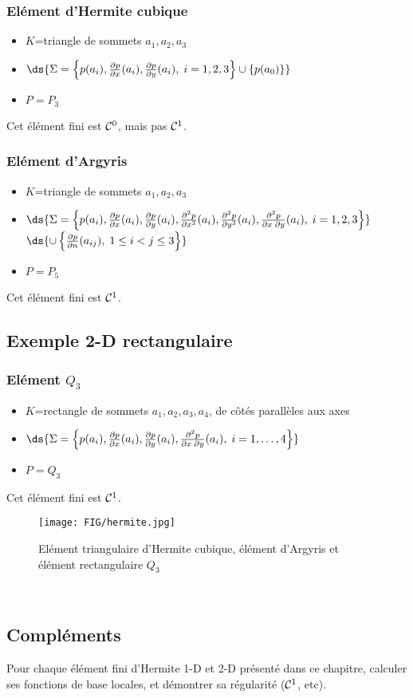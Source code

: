 \subsubsection{El\'ement d'Hermite cubique}
\begin{itemize}
\item $K$=triangle de sommets $a_1, a_2, a_3$
\item $\ds{ \Sigma=\left\{p(a_i),\frac{\partial p}{\partial x}(a_i), \frac{\partial p}{\partial y}(a_i), \; i=1,2,3\right\} \cup \left\{p(a_0)\right\} }$
\item $P=P_3$
\end{itemize}
%
Cet \'el\'ement fini est ${\cal C}^0$, mais pas ${\cal C}^1$.
%
\subsubsection{El\'ement d'Argyris}
\begin{itemize}
\item $K$=triangle de sommets $a_1, a_2, a_3$
\item $\ds{ \Sigma=\left\{p(a_i),\frac{\partial p}{\partial x}(a_i), \frac{\partial p}{\partial y}(a_i),\frac{\partial^2 p}{\partial x^2}(a_i), \frac{\partial^2 p}{\partial y^2}(a_i), \frac{\partial^2 p}{\partial x\; \partial y}(a_i),\; i=1,2,3\right\} }$\\
\hspace*{5 cm}$\ds{\cup \left\{\frac{\partial p}{\partial n}(a_{ij}), \; 1\le i < j \le 3\right\} }$
\item $P=P_5$
\end{itemize}
%
Cet \'el\'ement fini est ${\cal C}^1$.
%
%
\subsection{Exemple 2-D rectangulaire}
%
\subsubsection{El\'ement $Q_3$}
\begin{itemize}
\item $K$=rectangle de sommets $a_1, a_2, a_3, a_4$, de c\^ot\'es parall\`eles aux axes
\item $\ds{ \Sigma=\left\{p(a_i),\frac{\partial p}{\partial x}(a_i), \frac{\partial p}{\partial y}(a_i), \frac{\partial^2 p}{\partial x\; \partial y}(a_i),\; i=1,\ldots,4\right\} }$
\item $P=Q_3$ 
\end{itemize}
%
Cet \'el\'ement fini est ${\cal C}^1$.
%
%
%
%
\begin{figure}[h]
\begin{center}
\texttt{[image: FIG/hermite.jpg]}
\caption{El\'ement triangulaire d'Hermite cubique, \'el\'ement d'Argyris et \'el\'ement rectangulaire $Q_3$}
\end{center}
\end{figure}
%
%
%
\small
~\vspace*{3cm}\\
\subsection*{Compl\'ements}
\noindent
%
Pour chaque \'el\'ement fini  d'Hermite 1-D et 2-D pr\'esent\'e dans ce chapitre, calculer ses fonctions de base locales, et d\'emontrer sa r\'egularit\'e (${\cal C}^1$, etc).
%
\normalsize


